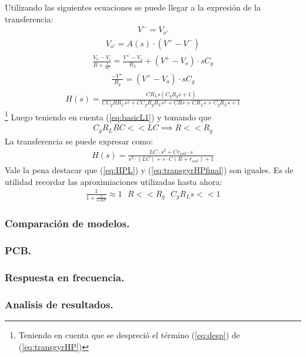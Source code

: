 \documentclass[a4paper]{article}
\begin{document}
Utilizando las siguientes ecuaciones se puede llegar a la expresión de la transferencia:
\begin{align}V^- = V_{o'}\end{align}
\begin{align}V_{o'} = A(s)\cdot (V^+-V^-)\end{align}
\begin{align}\frac{V_o-V_i}{R+\frac{1}{sC}} = \frac{V^+-V_o}{R_L}+(V^+-V_o)\cdot sC_g\end{align}
\begin{align}\frac{-V^+}{R_g}=(V^+-V_o)\cdot sC_g\end{align}
\begin{align} H(s) = \frac{C R_L s \left(C_g R_g s + 1\right)}{C C_g R R_L s^{2} + C C_g R_g R_L s^{2} + C R s + C R_L s + C_g R_L s + 1}\label{eq:transgyrHP}\end{align}\footnote{Teniendo en cuenta que se despreció el término (\ref{eq:desp}) de (\ref{eq:transgyrHP})}
Luego teniendo en cuenta (\ref{eq:basicL1}) y tomando que
\begin{align} C_gR_LRC<<LC \implies R<<R_g \end{align}
La transferencia  se puede expresar como:
 \begin{align} H(s) = \frac{LC\cdot s^2+Cr_{coil}\cdot s}{s^2 \cdot (LC)+s\cdot C(R+r_{coil})+1}\label{eq:transgyrHPfinal} 
\end{align}
Vale la pena destacar que (\ref{eq:HPL}) y (\ref{eq:transgyrHPfinal}) son iguales.
Es de utilidad recordar las aproximiaciones utilizadas hasta ahora:
\begin{align}  \frac{1}{1+\frac{s}{GBP}}\approx 1  \ \ \ R<<R_g \ \ \ C_gR_Ls << 1 \label{eq:basicL2}\end{align}
\subsubsection{Comparación de modelos.}
\subsubsection{PCB.}
\subsubsection{Respuesta en frecuencia.}
\subsubsection{Analisis de resultados.}
\end{document}
